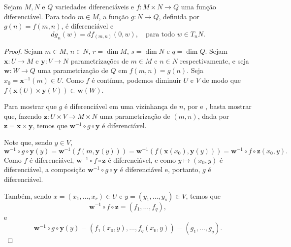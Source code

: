 	\begin{lemma}
		\label{lem:derivadas-produto-2}
		Sejam $M, N$ e $Q$ variedades diferenciáveis e $f:M\times N\to Q$ uma função diferenciável. Para todo $m \in M$, a função $g:N\to Q$, definida por $g(n)=f(m,n)$, é diferenciável e
		\begin{equation*}
			dg_{n}(w)=df_{(m,n)}(0,w), \quad \text{para todo } w\in T_nN.
		\end{equation*}
		\begin{proof}

			Sejam $m\in M$, $n\in N$, $r=\dim M$, $s=\dim N$ e $q=\dim Q$. Sejam $\mathbf{x}:U\to M$ e $\mathbf{y}:V\to N$ parametrizações de $m\in M$ e $n\in N$ respectivamente, e seja $\mathbf{w}:W\to Q$ uma parametrização de $Q$ em $f(m,n)=g(n)$. Seja $x_0=\mathbf{x}^{-1}(m)\in U$. Como $f$ é contínua, podemos diminuir $U$ e $V$ de modo que $f(\mathbf{x}(U)\times\mathbf{y}(V))\subset \mathbf{w}(W)$.

			Para mostrar que $g$ é diferenciável em uma vizinhança de $n$, por  e , basta mostrar que, fazendo $\mathbf{z}:U\times V\to M\times N$ uma parametrização de $(m,n)$, dada por $\mathbf{z}=\mathbf{x}\times\mathbf{y}$, temos que $\mathbf{w}^{-1} \circ g \circ \mathbf{y}$ é diferenciável.

			Note que, sendo $y \in V$,
			\begin{equation*}
				\mathbf{w}^{-1} \circ g \circ \mathbf{y}(y)=\mathbf{w}^{-1}(f(m,\mathbf{y}(y)))=\mathbf{w}^{-1}(f(\mathbf{x}(x_0),\mathbf{y}(y)))=\mathbf{w}^{-1} \circ f \circ \mathbf{z}(x_0,y).
			\end{equation*}
			Como $f$ é diferenciável, $\mathbf{w}^{-1} \circ f \circ \mathbf{z}$ é diferenciável, e como $y\mapsto(x_0,y)$ é diferenciável, a composição $\mathbf{w}^{-1} \circ g \circ \mathbf{y}$ é diferenciável e, portanto, $g$ é diferenciável.

			Também, sendo $x=(x_{1},\dots,x_{r}) \in U$ e $y=(y_{1}, \dots, y_{s})\in V$, temos que
			\begin{equation*}
				\mathbf{w}^{-1} \circ f\circ \mathbf{z}=(f_{1}, \dots, f_{q}),
			\end{equation*}
			e
			\begin{equation*}
				\mathbf{w}^{-1} \circ g\circ \mathbf{y}(y)=(f_{1}(x_0,y), \dots, f_{q}(x_0,y))=(g_{1}, \dots, g_{q}).
			\end{equation*}


\end{proof}
\end{lemma}
